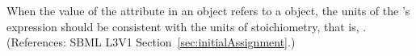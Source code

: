 When the value of the attribute  in an \InitialAssignment
object refers to a \SpeciesReference object, the units of the
\InitialAssignment's  expression should be consistent with the
units of stoichiometry, that is, .  (References: SBML
L3V1 Section~\ref{sec:initialAssignment}.)
